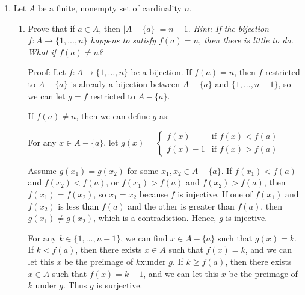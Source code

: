 \documentclass{article}
\newcommand{\sP}{\mathscr{P}}
\begin{document}
{\begin{enumerate}[labelindent=0pt,leftmargin=0pt]
\begin{enumerate}
    
    \item Use question 1(b) to determine, with proof, the cardinality of $\sP(A)$.

    Proof:
    From 2(a) we know there is a bijection between the power set $A$ denoted as $P(A)$, and the set $\{0,1\}^n$ where $n=|A|$

    From 1(b) we know the cardinality of the cartesian product of k finite sets is equal the the product of their cardinalities. 

    Applying this to the set $\{0,1\}^n$ we find that 
    $|\{0,1\}^n| = |\{0,1\}|^n = 2^n$ becasue the set $\{0,1\}$ has a cardinality of 2.

    Since there is bijection between $P(A)$ and $\{0,1\}^n$, they much have the same cardinality of the power set $A$.
    Thus, $|P(A)| = 2^n$
    $\Box$ 
    
    \end{enumerate}

    \item Let $A$ be a finite, nonempty set of cardinality $n$. \begin{enumerate}\item Prove that if $a\in A$, then $|A-\{a\}|=n-1$. \textit{Hint: If the bijection $f:A\to\{1,...,n\}$ happens to satisfy $f(a)=n$, then there is little to do. What if $f(a)\neq n$?}


    Proof:
    Let $f:A\rightarrow \{1, ..., n\}$ be a bijection. 
    If $f(a) = n$, then $f$ restricted to $A - \{a\}$ is already a bijection between $A - \{a\}$ and $\{1, ..., n-1\}$, so we can let $g = f$ restricted to $A - \{a\}$.
    
    If $f(a) \neq n$, then we can define $g$ as:
   
    For any $x \in A - \{a\}$, let
    $g(x) = \begin{cases} 
    f(x) & \text{if } f(x) < f(a) \\
    f(x) - 1 & \text{if } f(x) > f(a) 
    \end{cases}$
    
    Assume $g(x_1) = g(x_2)$ for some $x_1, x_2 \in A - \{a\}$. If $f(x_1) < f(a)$ and $f(x_2) < f(a)$, or $f(x_1) > f(a)$ and $f(x_2) > f(a)$, then $f(x_1) = f(x_2)$, so $x_1 = x_2$ because $f$ is injective. If one of $f(x_1)$ and $f(x_2)$ is less than $f(a)$ and the other is greater than $f(a)$, then $g(x_1) \neq g(x_2)$, which is a contradiction. Hence, $g$ is injective.
    
    For any $k \in \{1, ..., n-1\}$, we can find $x \in A - \{a\}$ such that $g(x) = k$. If $k < f(a)$, then there exists $x \in A$ such that $f(x) = k$, and we can let this $x$ be the preimage of $k$xunder $g$. If $k \geq f(a)$, then there exists $x \in A$ such that $f(x) = k + 1$, and we can let this $x$ be the preimage of $k$ under $g$. 
    Thus $g$ is surjective.
    

\end{enumerate}
\end{enumerate}}
\end{document}
